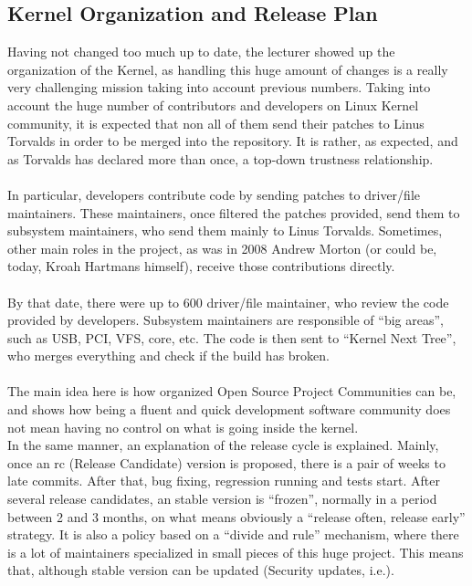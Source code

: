 \documentclass[11pt]{article}
\begin{document}
\subsection{Kernel Organization and Release Plan}
Having not changed too much up to date, the lecturer showed up the organization of the Kernel, as handling this huge amount of changes is a really very challenging mission taking into account previous numbers. Taking into account the huge number of contributors and developers on Linux Kernel community, it is expected that non all of them send their patches to Linus Torvalds in order to be merged into the repository. It is rather, as expected, and as Torvalds has declared more than once, a top-down trustness relationship.\\
\\
In particular, developers contribute code by sending patches to driver/file maintainers. These maintainers, once filtered the patches provided, send them to subsystem maintainers, who send them mainly to Linus Torvalds. Sometimes, other main roles in the project, as was in 2008 Andrew Morton (or could be, today, Kroah Hartmans himself), receive those contributions directly.\\
\\
By that date, there were up to 600 driver/file maintainer, who review the code provided by developers. Subsystem maintainers are responsible of ``big areas'', such as USB, PCI, VFS, core, etc. The code is then sent to ``Kernel Next Tree'', who merges everything and check if the build has broken.\\
\\
The main idea here is how organized Open Source Project Communities can be, and shows how being a fluent and quick development software community does not mean having no control on what is going inside the kernel.\\
In the same manner, an explanation of the release cycle is explained. Mainly, once an rc (Release Candidate) version is proposed, there is a pair of weeks to late commits. After that, bug fixing, regression running and tests start. After several release candidates, an stable version is ``frozen'', normally in a period between 2 and 3 months, on what means obviously a ``release often, release early'' strategy. It is also a policy based on a ``divide and rule'' mechanism, where there is a lot of maintainers specialized in small pieces of this huge project. This means that, although stable version can be updated (Security updates, i.e.).\\
\end{document}
